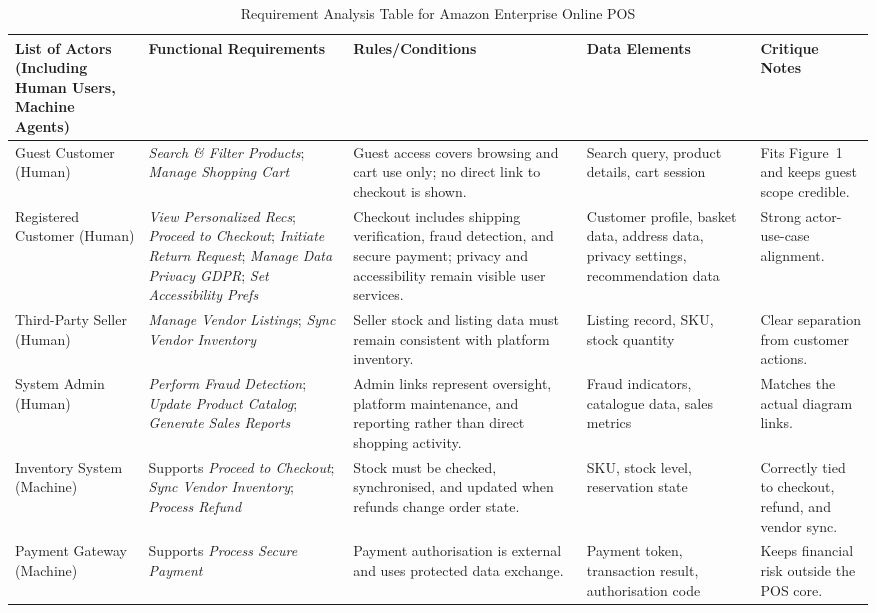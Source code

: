 \documentclass[11pt,a4paper]{article}
\renewcommand{\arraystretch}{1.08}
\begin{document}
\begin{table}[t]
\centering
\footnotesize
\setlength{\tabcolsep}{3pt}
\renewcommand{\arraystretch}{1.04}
\caption{Requirement Analysis Table for Amazon Enterprise Online POS}
\begin{tabular}{|>{\raggedright\arraybackslash}p{2.15cm}|>{\raggedright\arraybackslash}p{3.35cm}|>{\raggedright\arraybackslash}p{4.15cm}|>{\raggedright\arraybackslash}p{2.1cm}|>{\raggedright\arraybackslash}p{2.35cm}|}
\hline
\rowcolor[gray]{0.92}\textbf{List of Actors (Including Human Users, Machine Agents)} & \textbf{Functional Requirements} & \textbf{Rules/Conditions} & \textbf{Data Elements} & \textbf{Critique Notes} \\ \hline
Guest Customer (Human) & \textit{Search \& Filter Products}; \textit{Manage Shopping Cart} & Guest access covers browsing and cart use only; no direct link to checkout is shown. & Search query, product details, cart session & Fits Figure~1 and keeps guest scope credible. \\ \hline
Registered Customer (Human) & \textit{View Personalized Recs}; \textit{Proceed to Checkout}; \textit{Initiate Return Request}; \textit{Manage Data Privacy GDPR}; \textit{Set Accessibility Prefs} & Checkout includes shipping verification, fraud detection, and secure payment; privacy and accessibility remain visible user services. & Customer profile, basket data, address data, privacy settings, recommendation data & Strong actor-use-case alignment. \\ \hline
Third-Party Seller (Human) & \textit{Manage Vendor Listings}; \textit{Sync Vendor Inventory} & Seller stock and listing data must remain consistent with platform inventory. & Listing record, SKU, stock quantity & Clear separation from customer actions. \\ \hline
System Admin (Human) & \textit{Perform Fraud Detection}; \textit{Update Product Catalog}; \textit{Generate Sales Reports} & Admin links represent oversight, platform maintenance, and reporting rather than direct shopping activity. & Fraud indicators, catalogue data, sales metrics & Matches the actual diagram links. \\ \hline
Inventory System (Machine) & Supports \textit{Proceed to Checkout}; \textit{Sync Vendor Inventory}; \textit{Process Refund} & Stock must be checked, synchronised, and updated when refunds change order state. & SKU, stock level, reservation state & Correctly tied to checkout, refund, and vendor sync. \\ \hline
Payment Gateway (Machine) & Supports \textit{Process Secure Payment} & Payment authorisation is external and uses protected data exchange. & Payment token, transaction result, authorisation code & Keeps financial risk outside the POS core. \\ \hline

\end{tabular}
\end{table}
\end{document}

